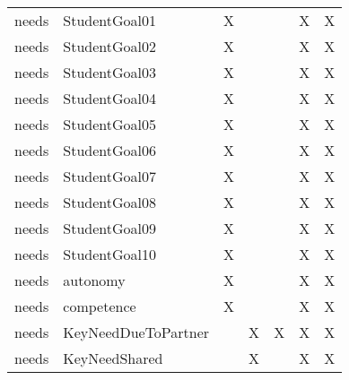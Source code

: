 \documentclass[
]{article}
\begin{document}
\begin{table}
\begin{tabular}[t]{llccccc}
needs & StudentGoal01 & X &  &  & X & X\\
needs & StudentGoal02 & X &  &  & X & X\\
needs & StudentGoal03 & X &  &  & X & X\\
needs & StudentGoal04 & X &  &  & X & X\\
\addlinespace
needs & StudentGoal05 & X &  &  & X & X\\
needs & StudentGoal06 & X &  &  & X & X\\
needs & StudentGoal07 & X &  &  & X & X\\
needs & StudentGoal08 & X &  &  & X & X\\
needs & StudentGoal09 & X &  &  & X & X\\
\addlinespace
needs & StudentGoal10 & X &  &  & X & X\\
needs & autonomy & X &  &  & X & X\\
needs & competence & X &  &  & X & X\\
needs & KeyNeedDueToPartner &  & X & X & X & X\\
needs & KeyNeedShared &  & X &  & X & X\\
\bottomrule
\end{tabular}
\end{table}
\end{document}
